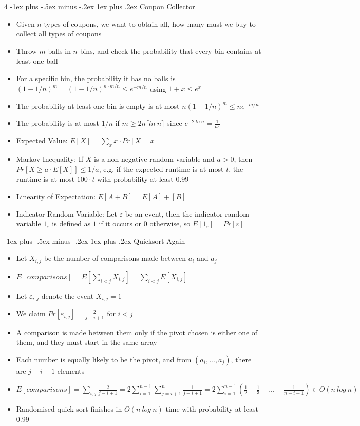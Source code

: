 \documentclass[10pt, landscape]{article}
\makeatletter
\renewcommand{\subsection}{\@startsection{subsection}{3}{0mm}%
                                {-1ex plus -.5ex minus -.2ex}%
                                {1ex plus .2ex}%
                                {\normalfont\small\bfseries}}%
\makeatother
\begin{document}
\begin{multicols*}{4}
\subsection{Coupon Collector}
\begin{itemize}
    \item Given $n$ types of coupons, we want to obtain all, how many must we buy to collect all types of coupons
    \item Throw $m$ balls in $n$ bins, and check the probability that every bin contains at least one ball
    \item For a specific bin, the probability it has no balls is $(1-1/n)^m=(1-1/n)^{n\cdot m/n}\leq e^{-m/n}$ using $1+x \leq e^x$
    \item The probability at least one bin is empty is at most $n(1-1/n)^m \leq ne^{-m/n}$
    \item The probability is at most $1/n$ if $m \geq 2n\lceil ln\ n\rceil$ since $e^{-2\ ln\ n}=\frac{1}{n^2}$
    \item Expected Value: $E[X]=\sum_x x \cdot Pr[X=x]$
    \item Markov Inequality: If $X$ is a non-negative random variable and $a>0$, then $Pr[X \geq a \cdot E[X]] \leq 1/a$, e.g. if the expected runtime is at most $t$, the runtime is at most $100 \cdot t$ with probability at least $0.99$
    \item Linearity of Expectation: $E[A+B]=E[A]+[B]$
    \item Indicator Random Variable: Let $\varepsilon$ be an event, then the indicator random variable $1_\varepsilon$ is defined as $1$ if it occurs or $0$ otherwise, so $E[1_\varepsilon]=Pr[\varepsilon]$
\end{itemize}

\subsection{Quicksort Again}
\begin{itemize}
    \item Let $X_{i,j}$ be the number of comparisons made between $a_i$ and $a_j$
    \item $E[comparisons]=E[\sum_{i<j}X_{i,j}]=\sum_{i<j}E[X_{i,j}]$
    \item Let $\varepsilon_{i,j}$ denote the event $X_{i,j}=1$
    \item We claim $Pr[\varepsilon_{i,j}] = \frac{2}{j-i+1}$ for $i<j$
    \item A comparison is made between them only if the pivot chosen is either one of them, and they must start in the same array
    \item Each number is equally likely to be the pivot, and from $(a_i,...,a_j)$, there are $j-i+1$ elements
    \item $E[comparisons]=\sum_{i,j}\frac{2}{j-i+1}=2\sum_{i=1}^{n-1}\sum_{j=i+1}^n\frac{1}{j-i+1}=2\sum_{i=1}^{n-1}(\frac{1}{2}+\frac{1}{3}+...+\frac{1}{n-i+1})\in O(n\ log\ n)$
    \item Randomised quick sort finishes in $O(n\ log\ n)$ time with probability at least 0.99
\end{itemize}


\end{multicols*}
\end{document}
